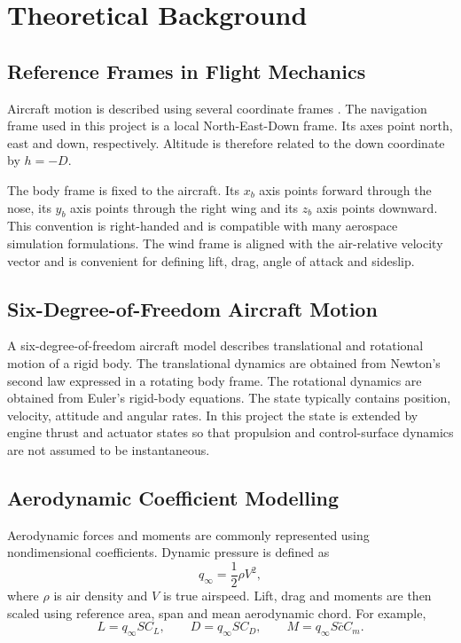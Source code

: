 \chapter{Theoretical Background}

\section{Reference Frames in Flight Mechanics}

Aircraft motion is described using several coordinate frames \cite{stevens2015aircraft,cook2012flight}. The navigation frame used in this project is a local North-East-Down frame. Its axes point north, east and down, respectively. Altitude is therefore related to the down coordinate by $h=-D$.

The body frame is fixed to the aircraft. Its $x_b$ axis points forward through the nose, its $y_b$ axis points through the right wing and its $z_b$ axis points downward. This convention is right-handed and is compatible with many aerospace simulation formulations. The wind frame is aligned with the air-relative velocity vector and is convenient for defining lift, drag, angle of attack and sideslip.

\section{Six-Degree-of-Freedom Aircraft Motion}

A six-degree-of-freedom aircraft model describes translational and rotational motion of a rigid body. The translational dynamics are obtained from Newton's second law expressed in a rotating body frame. The rotational dynamics are obtained from Euler's rigid-body equations. The state typically contains position, velocity, attitude and angular rates. In this project the state is extended by engine thrust and actuator states so that propulsion and control-surface dynamics are not assumed to be instantaneous.

\section{Aerodynamic Coefficient Modelling}

Aerodynamic forces and moments are commonly represented using nondimensional coefficients. Dynamic pressure is defined as
\begin{equation}
    q_{\infty} = \frac{1}{2}\rho V^2,
\end{equation}
where $\rho$ is air density and $V$ is true airspeed. Lift, drag and moments are then scaled using reference area, span and mean aerodynamic chord. For example,
\begin{equation}
    L = q_{\infty} S C_L, \qquad
    D = q_{\infty} S C_D, \qquad
    M = q_{\infty} S \bar{c} C_m .
\end{equation}

